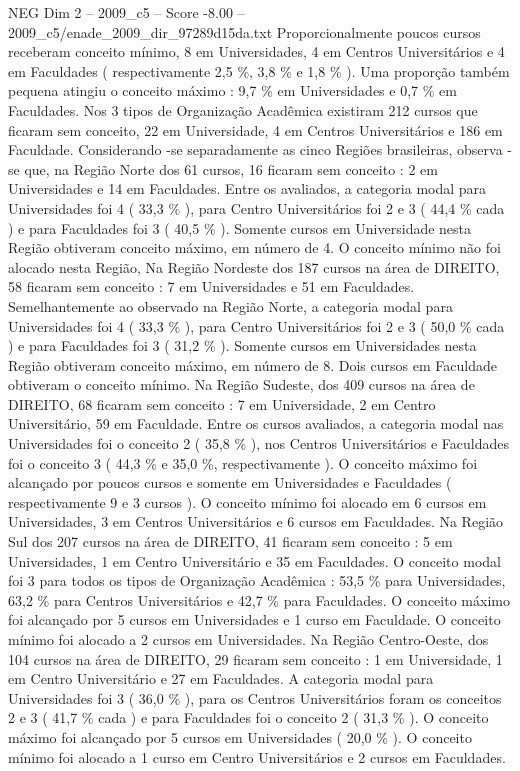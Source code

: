 \begin{textsample}{NEG Dim 2 – 2009\_c5 – Score -8.00 – 2009\_c5/enade\_2009\_dir\_97289d15da.txt}
Proporcionalmente poucos cursos receberam conceito mínimo, 8 em Universidades, 4 em Centros Universitários e 4 em Faculdades ( respectivamente 2,5 \%, 3,8 \% e 1,8 \% ).
Uma proporção também pequena atingiu o conceito máximo : 9,7 \% em Universidades e 0,7 \% em Faculdades.
Nos 3 tipos de Organização Acadêmica existiram 212 cursos que ficaram sem conceito, 22 em Universidade, 4 em Centros Universitários e 186 em Faculdade.
Considerando -se separadamente as cinco Regiões brasileiras, observa -se que, na Região Norte dos 61 cursos, 16 ficaram sem conceito : 2 em Universidades e 14 em Faculdades.
Entre os avaliados, a categoria modal para Universidades foi 4 ( 33,3 \% ), para Centro Universitários foi 2 e 3 ( 44,4 \% cada ) e para Faculdades foi 3 ( 40,5 \% ).
Somente cursos em Universidade nesta Região obtiveram conceito máximo, em número de 4.
O conceito mínimo não foi alocado nesta Região, Na Região Nordeste dos 187 cursos na área de DIREITO, 58 ficaram sem conceito : 7 em Universidades e 51 em Faculdades.
Semelhantemente ao observado na Região Norte, a categoria modal para Universidades foi 4 ( 33,3 \% ), para Centro Universitários foi 2 e 3 ( 50,0 \% cada ) e para Faculdades foi 3 ( 31,2 \% ).
Somente cursos em Universidades nesta Região obtiveram conceito máximo, em número de 8.
Dois cursos em Faculdade obtiveram o conceito mínimo.
Na Região Sudeste, dos 409 cursos na área de DIREITO, 68 ficaram sem conceito : 7 em Universidade, 2 em Centro Universitário, 59 em Faculdade.
Entre os cursos avaliados, a categoria modal nas Universidades foi o conceito 2 ( 35,8 \% ), nos Centros Universitários e Faculdades foi o conceito 3 ( 44,3 \% e 35,0 \%, respectivamente ).
O conceito máximo foi alcançado por poucos cursos e somente em Universidades e Faculdades ( respectivamente 9 e 3 cursos ).
O conceito mínimo foi alocado em 6 cursos em Universidades, 3 em Centros Universitários e 6 cursos em Faculdades.
Na Região Sul dos 207 cursos na área de DIREITO, 41 ficaram sem conceito : 5 em Universidades, 1 em Centro Universitário e 35 em Faculdades.
O conceito modal foi 3 para todos os tipos de Organização Acadêmica : 53,5 \% para Universidades, 63,2 \% para Centros Universitários e 42,7 \% para Faculdades.
O conceito máximo foi alcançado por 5 cursos em Universidades e 1 curso em Faculdade.
O conceito mínimo foi alocado a 2 cursos em Universidades.
Na Região Centro-Oeste, dos 104 cursos na área de DIREITO, 29 ficaram sem conceito : 1 em Universidade, 1 em Centro Universitário e 27 em Faculdades.
A categoria modal para Universidades foi 3 ( 36,0 \% ), para os Centros Universitários foram os conceitos 2 e 3 ( 41,7 \% cada ) e para Faculdades foi o conceito 2 ( 31,3 \% ).
O conceito máximo foi alcançado por 5 cursos em Universidades ( 20,0 \% ).
O conceito mínimo foi alocado a 1 curso em Centro Universitários e 2 cursos em Faculdades.

\end{textsample}
